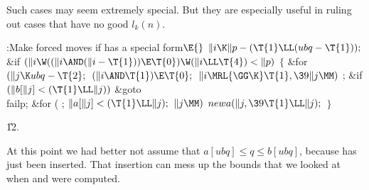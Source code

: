 Such cases may seem extremely special. But they are especially
useful in ruling out cases that have no good $l_k(n)$.

\Y\B\4:Make forced moves if  has a special form\X${}\E{}$\6
$\|i\K\|p-(\T{1}\LL(\\{ubq}-\T{1}));{}$\6
\&{if} ${}(\|i\W((\|i\AND(\|i-\T{1}))\E\T{0})\W(\|i\LL\T{4})<\|p){}$\5
${}\{{}$\1\6
\&{for} ${}(\|j\K\\{ubq}-\T{2};{}$ ${}(\|i\AND\T{1})\E\T{0};{}$ ${}\|i\MRL{{%
\GG}{\K}}\T{1},\39\|j\MM){}$\1\5
;\2\6
\&{if} ${}(\|b[\|j]<(\T{1}\LL\|j)){}$\1\5
\&{goto} \\{failp};\2\6
\&{for} ( ; ${}\|a[\|j]<(\T{1}\LL\|j);{}$ ${}\|j\MM){}$\1\5
${}\\{newa}(\|j,\39\T{1}\LL\|j);{}$\2\6
\4${}\}{}$\2\par
\U12.\fi

At this point we had better not assume that $a[ubq]\le q\le b[ubq]$,
because  has just been inserted. That insertion can mess up the
bounds that we looked at when  and  were computed.

